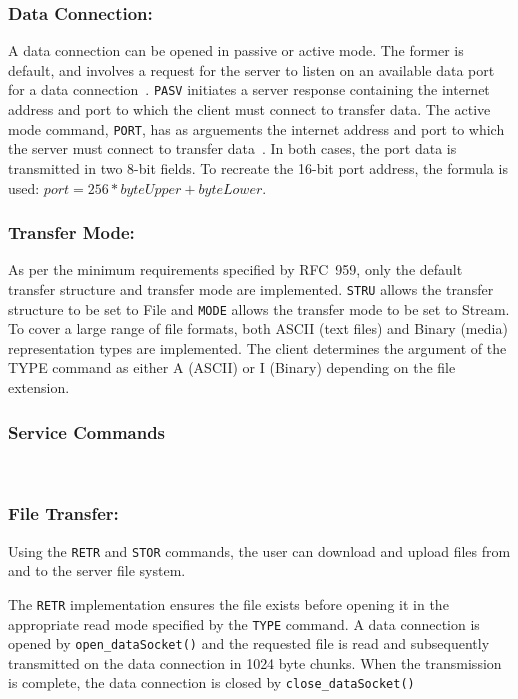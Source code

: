 \documentclass[10pt,twocolumn]{witseiepaper}
\begin{document}
\vspace*{-2mm}
\subsubsection*{Data Connection:} A data connection can be opened in passive or active mode. The former is default, and involves a request for the server to listen on an available data port for a data connection~\cite{rfc959}. \texttt{PASV} initiates a server response 
containing the internet address and port to which the client must connect to transfer data. The active mode command, \texttt{PORT}, has as arguements the internet address and port to which the server must connect to transfer data~\cite{rfc959}. In both cases, the port data is transmitted in two 8-bit fields. To recreate the 16-bit port address, the formula is used: $port = 256*byteUpper + byteLower$.

\vspace*{-2mm}
\subsubsection*{Transfer Mode:} 
As per the minimum requirements specified by RFC~959, only the default transfer structure and transfer mode are implemented. \texttt{STRU} allows the transfer structure to be set to File and \texttt{MODE} allows the transfer mode to be set to Stream. To cover a large range of file formats, both ASCII (text files) and Binary (media) representation types are implemented. The client determines the argument of the TYPE command as either A (ASCII) or I (Binary) depending on the file extension.

\vspace*{-2mm}
\subsubsection{Service Commands} $    $

\vspace*{-2mm}
\subsubsection*{File Transfer:}
Using the \texttt{RETR} and \texttt{STOR} commands, the user can download and upload files from and to the server file system. 

The \texttt{RETR} implementation ensures the file exists before opening it in the appropriate read mode specified by the \texttt{TYPE} command. A data connection is opened by \texttt{open\_dataSocket()} and the requested file is read and subsequently transmitted on the data connection in 1024 byte chunks. When the transmission is complete, the data connection is closed by \texttt{close\_dataSocket()} 
\end{document}
